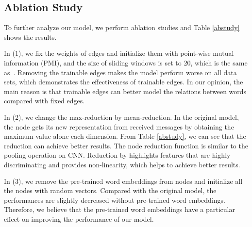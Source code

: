 \documentclass[11pt,a4paper]{article}
\begin{document}
\subsection{Ablation Study}
To further analyze our model, we perform ablation studies and Table \ref{abstudy} shows the results.
\begin{table}[t]
\centering
\footnotesize
{}
\caption{\label{abstudy} Results of ablation studies. We run all models for 5 times and give mean results. }


\end{table}

In (1), we fix the weights of edges and initialize them with point-wise mutual information (PMI), and the size of sliding windows is set to 20, which is the same as~\cite{yao2018graph}. Removing the trainable edges makes the model perform worse on all data sets, which demonstrates the effectiveness of trainable edges. 
In our opinion, the main reason is that trainable edges can better model the relations between words compared with fixed edges.


In (2), we change the max-reduction by mean-reduction. In the original model, the node gets its new representation from received messages by obtaining the maximum value alone each dimension. From Table \ref{abstudy}, we can see that the  reduction can achieve better results. The node reduction function is similar to the pooling operation on CNN. Reduction by  highlights features that are highly discriminating and provides non-linearity, which helps to achieve better results.

In (3), we remove the pre-trained word embeddings from nodes and initialize all the nodes with random vectors. Compared with the original model, the performances are slightly decreased without pre-trained word embeddings. Therefore, we believe that the pre-trained word embeddings have a particular effect on improving the performance of our model.
\end{document}
